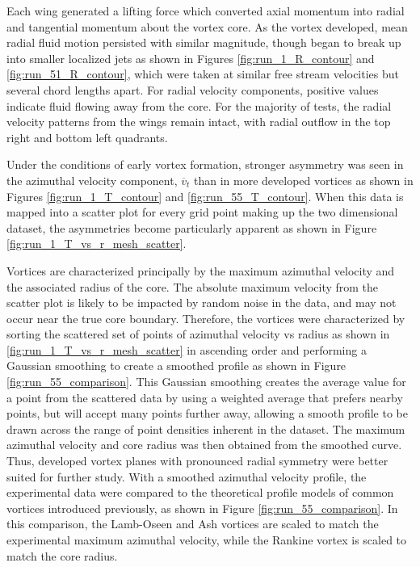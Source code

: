 Each wing generated a lifting force which converted axial momentum into radial 
and tangential momentum about the vortex core. As the vortex developed, mean 
radial fluid motion persisted with similar magnitude, though began to break up 
into smaller localized jets as shown in Figures \ref{fig:run_1_R_contour} and 
\ref{fig:run_51_R_contour}, which were taken at similar free stream velocities 
but several chord lengths apart. For radial velocity components, positive 
values indicate fluid flowing away from the core. For the majority of tests, 
the radial velocity patterns from the wings remain intact, with radial outflow 
in the top right and bottom left quadrants. 




Under the conditions of early vortex formation, stronger asymmetry was seen in 
the azimuthal velocity component, $\overline v_{t}$ than in more developed 
vortices as 
shown in Figures \ref{fig:run_1_T_contour} and \ref{fig:run_55_T_contour}. When 
this data is mapped into a scatter plot for every grid point making up the 
two dimensional dataset, the asymmetries become particularly apparent as shown 
in Figure \ref{fig:run_1_T_vs_r_mesh_scatter}.





Vortices are characterized principally by the maximum azimuthal velocity 
and the associated radius of the core. The absolute maximum velocity from the 
scatter plot is likely to be impacted by random noise in the data, and may 
not occur near the true core boundary. Therefore, the vortices were 
characterized by sorting the scattered set of points of azimuthal velocity vs 
radius as shown in \ref{fig:run_1_T_vs_r_mesh_scatter} in ascending order and 
performing a Gaussian smoothing to create a smoothed profile as shown in Figure 
\ref{fig:run_55_comparison}. This Gaussian smoothing creates the average value 
for a point from the scattered data by using a weighted average that prefers 
nearby points, but will accept many points further away, allowing a smooth 
profile to be drawn across the range of point densities inherent in the 
dataset. The 
maximum azimuthal velocity and core radius was then obtained from the smoothed 
curve. Thus,
developed vortex planes with pronounced radial symmetry were better suited for 
further study. With a smoothed azimuthal velocity profile, the experimental 
data were compared to the theoretical profile models of common vortices 
introduced previously, as shown in Figure \ref{fig:run_55_comparison}. In this 
comparison, the Lamb-Oseen and Ash vortices are scaled to match the 
experimental maximum azimuthal velocity, while the Rankine vortex is scaled to 
match the core radius.

